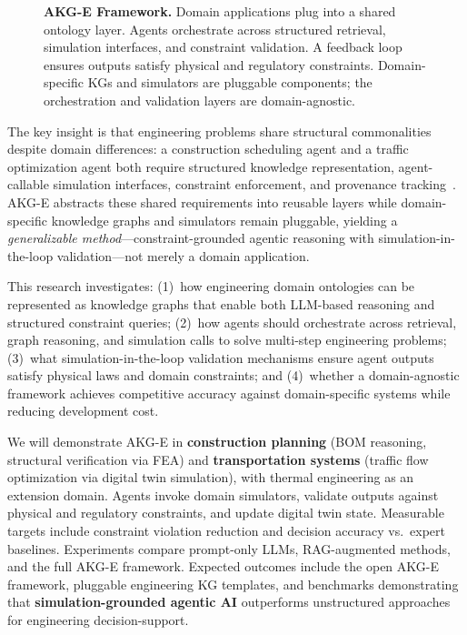 \documentclass[conference, 10pt]{IEEEtran}
\begin{document}
\begin{figure}[t]
{
    }%
    \caption{\textbf{AKG-E Framework.} Domain applications plug into a shared ontology layer. Agents orchestrate across structured retrieval, simulation interfaces, and constraint validation. A feedback loop ensures outputs satisfy physical and regulatory constraints. Domain-specific KGs and simulators are pluggable components; the orchestration and validation layers are domain-agnostic.}
    \label{fig:framework}
    \vspace{-0.5em}
\end{figure}

The key insight is that engineering problems share structural commonalities despite domain differences: a construction scheduling agent and a traffic optimization agent both require structured knowledge representation, agent-callable simulation interfaces, constraint enforcement, and provenance tracking~\cite{OpenTelemetryGenAI2024}. AKG-E abstracts these shared requirements into reusable layers while domain-specific knowledge graphs and simulators remain pluggable, yielding a \textit{generalizable method}---constraint-grounded agentic reasoning with simulation-in-the-loop validation---not merely a domain application.

This research investigates: (1)~how engineering domain ontologies can be represented as knowledge graphs that enable both LLM-based reasoning and structured constraint queries; (2)~how agents should orchestrate across retrieval, graph reasoning, and simulation calls to solve multi-step engineering problems; (3)~what simulation-in-the-loop validation mechanisms ensure agent outputs satisfy physical laws and domain constraints; and (4)~whether a domain-agnostic framework achieves competitive accuracy against domain-specific systems while reducing development cost.

We will demonstrate AKG-E in \textbf{construction planning} (BOM reasoning, structural verification via FEA) and \textbf{transportation systems} (traffic flow optimization via digital twin simulation), with thermal engineering as an extension domain. Agents invoke domain simulators, validate outputs against physical and regulatory constraints, and update digital twin state. Measurable targets include constraint violation reduction and decision accuracy vs.\ expert baselines. Experiments compare prompt-only LLMs, RAG-augmented methods, and the full AKG-E framework. Expected outcomes include the open AKG-E framework, pluggable engineering KG templates, and benchmarks demonstrating that \textbf{simulation-grounded agentic AI} outperforms unstructured approaches for engineering decision-support.



\end{document}
